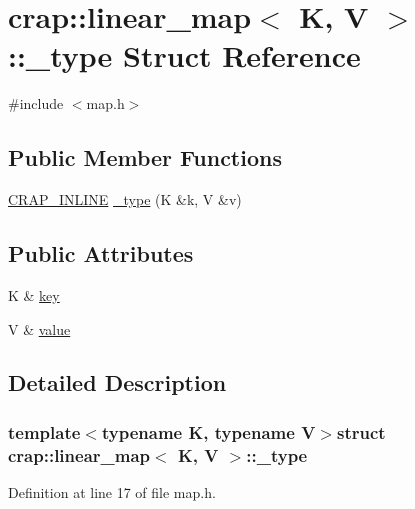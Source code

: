 \hypertarget{structcrap_1_1linear__map_1_1__type}{\section{crap\+:\+:linear\+\_\+map$<$ K, V $>$\+:\+:\+\_\+type Struct Reference}
\label{structcrap_1_1linear__map_1_1__type}
}


{\ttfamily \#include $<$map.\+h$>$}

\subsection*{Public Member Functions}
\begin{DoxyCompactItemize}
\item 
\hyperlink{config__x86_8h_a5a40526b8d842e7ff731509998bb0f1c}{C\+R\+A\+P\+\_\+\+I\+N\+L\+I\+N\+E} \hyperlink{structcrap_1_1linear__map_1_1__type_a17065f2f2c7df6c67eecd25edde070a8}{\+\_\+type} (K \&k, V \&v)
\end{DoxyCompactItemize}
\subsection*{Public Attributes}
\begin{DoxyCompactItemize}
\item 
K \& \hyperlink{structcrap_1_1linear__map_1_1__type_a7a5f21235c361213a3c68d72a53195ff}{key}
\item 
V \& \hyperlink{structcrap_1_1linear__map_1_1__type_ade151d9a1da867bb307bf9fbd0872c9e}{value}
\end{DoxyCompactItemize}


\subsection{Detailed Description}
\subsubsection*{template$<$typename K, typename V$>$struct crap\+::linear\+\_\+map$<$ K, V $>$\+::\+\_\+type}



Definition at line 17 of file map.\+h.



